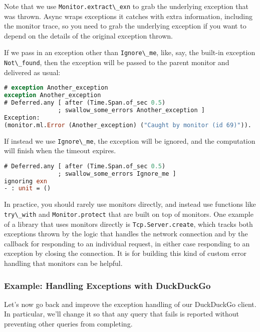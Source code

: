 Note that we use \passthrough{\lstinline!Monitor.extract\_exn!} to grab
the underlying exception that was thrown. Async wraps exceptions it
catches with extra information, including the monitor trace, so you need
to grab the underlying exception if you want to depend on the details of
the original exception thrown.

If we pass in an exception other than
\passthrough{\lstinline!Ignore\_me!}, like, say, the built-in exception
\passthrough{\lstinline!Not\_found!}, then the exception will be passed
to the parent monitor and delivered as usual:

\begin{lstlisting}[language=Caml]
# exception Another_exception
exception Another_exception
# Deferred.any [ after (Time.Span.of_sec 0.5)
               ; swallow_some_errors Another_exception ]
Exception:
(monitor.ml.Error (Another_exception) ("Caught by monitor (id 69)")).
\end{lstlisting}

If instead we use \passthrough{\lstinline!Ignore\_me!}, the exception
will be ignored, and the computation will finish when the timeout
expires.

\begin{lstlisting}[language=Caml]
# Deferred.any [ after (Time.Span.of_sec 0.5)
               ; swallow_some_errors Ignore_me ]
ignoring exn
- : unit = ()
\end{lstlisting}

In practice, you should rarely use monitors directly, and instead use
functions like \passthrough{\lstinline!try\_with!} and
\passthrough{\lstinline!Monitor.protect!} that are built on top of
monitors. One example of a library that uses monitors directly is
\passthrough{\lstinline!Tcp.Server.create!}, which tracks both
exceptions thrown by the logic that handles the network connection and
by the callback for responding to an individual request, in either case
responding to an exception by closing the connection. It is for building
this kind of custom error handling that monitors can be helpful.

\hypertarget{example-handling-exceptions-with-duckduckgo}{%
\subsubsection{Example: Handling Exceptions with
DuckDuckGo}\label{example-handling-exceptions-with-duckduckgo}}

Let's now go back and improve the exception handling of our DuckDuckGo
client. In particular, we'll change it so that any query that fails is
reported without preventing other queries from completing.


